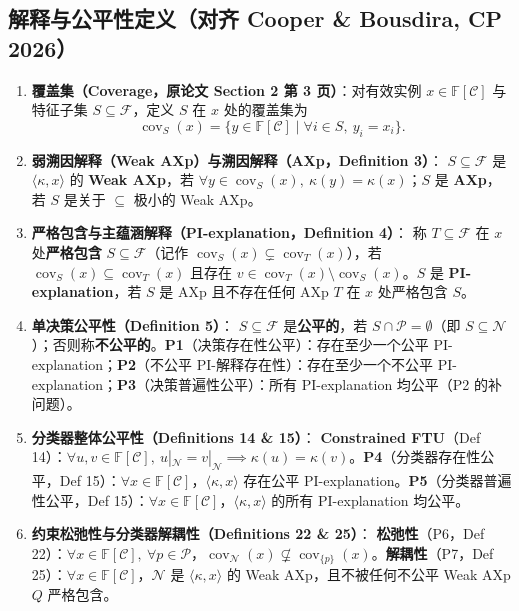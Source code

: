 \documentclass[11pt,a4paper]{article}
\newcommand{\F}{\mathbb{F}}
\newcommand{\C}{\mathcal{C}}
\newcommand{\N}{\mathcal{N}}
\newcommand{\Prot}{\mathcal{P}}
\newcommand{\cov}{\operatorname{cov}}
\begin{document}
\subsection{解释与公平性定义（对齐 Cooper \& Bousdira, CP 2026）}
\begin{enumerate}
  \item \textbf{覆盖集（Coverage，原论文 Section 2 第 3 页）}：对有效实例 $x \in \F[\C]$ 与特征子集 $S \subseteq \mathcal{F}$，定义 $S$ 在 $x$ 处的覆盖集为
  \[
    \cov_S(x) = \{y \in \F[\C] \mid \forall i \in S,\ y_i = x_i\}.
  \]
  \item \textbf{弱溯因解释（Weak AXp）与溯因解释（AXp，Definition 3）}：
  $S \subseteq \mathcal{F}$ 是 $\langle \kappa, x \rangle$ 的 \textbf{Weak AXp}，若 $\forall y \in \cov_S(x),\ \kappa(y) = \kappa(x)$；$S$ 是 \textbf{AXp}，若 $S$ 是关于 $\subseteq$ 极小的 Weak AXp。
  \item \textbf{严格包含与主蕴涵解释（PI-explanation，Definition 4）}：
  称 $T \subseteq \mathcal{F}$ 在 $x$ 处\textbf{严格包含} $S \subseteq \mathcal{F}$（记作 $\cov_S(x) \subsetneq \cov_T(x)$），若 $\cov_S(x) \subseteq \cov_T(x)$ 且存在 $v \in \cov_T(x) \setminus \cov_S(x)$。$S$ 是 \textbf{PI-explanation}，若 $S$ 是 AXp 且不存在任何 AXp $T$ 在 $x$ 处严格包含 $S$。
  \item \textbf{单决策公平性（Definition 5）}：
  $S \subseteq \mathcal{F}$ 是\textbf{公平的}，若 $S \cap \Prot = \emptyset$（即 $S \subseteq \N$）；否则称\textbf{不公平的}。\textbf{P1}（决策存在性公平）：存在至少一个公平 PI-explanation；\textbf{P2}（不公平 PI-解释存在性）：存在至少一个不公平 PI-explanation；\textbf{P3}（决策普遍性公平）：所有 PI-explanation 均公平（P2 的补问题）。
  \item \textbf{分类器整体公平性（Definitions 14 \& 15）}：
  \textbf{Constrained FTU}（Def 14）：$\forall u, v \in \F[\C],\ u|_{\N} = v|_{\N} \implies \kappa(u) = \kappa(v)$。\textbf{P4}（分类器存在性公平，Def 15）：$\forall x \in \F[\C]$，$\langle \kappa, x \rangle$ 存在公平 PI-explanation。\textbf{P5}（分类器普遍性公平，Def 15）：$\forall x \in \F[\C]$，$\langle \kappa, x \rangle$ 的所有 PI-explanation 均公平。
  \item \textbf{约束松弛性与分类器解耦性（Definitions 22 \& 25）}：
  \textbf{松弛性}（P6，Def 22）：$\forall x \in \F[\C],\ \forall p \in \Prot$，$\cov_{\N}(x) \not\subsetneq \cov_{\{p\}}(x)$。\textbf{解耦性}（P7，Def 25）：$\forall x \in \F[\C]$，$\N$ 是 $\langle \kappa, x \rangle$ 的 Weak AXp，且不被任何不公平 Weak AXp $Q$ 严格包含。
\end{enumerate}
\end{document}

